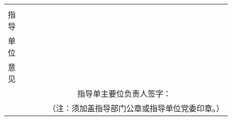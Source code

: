 \documentclass{BaseSetting}
\begin{document}
\begin{table}[H]
\begin{tabular}{|p{0.05\linewidth}|p{0.3\linewidth}|p{0.28\linewidth}|p{0.28\linewidth}|}
		     & \multicolumn{3}{c|}{}                                                                                                            \\
		指导 & \multicolumn{3}{c|}{}                                                                                                            \\
		单位 & \multicolumn{3}{c|}{}                                                                                                            \\
		意见 & \multicolumn{3}{c|}{}                                                                                                            \\
		     & \multicolumn{3}{c|}{指导单主要位负责人签字：}                                                                                    \\\hline
		\multicolumn{4}{|r|}{（注：须加盖指导部门公章或指导单位党委印章。）}                                                                    \\ \hline
	\end{tabular}
\end{table}
\end{document}
